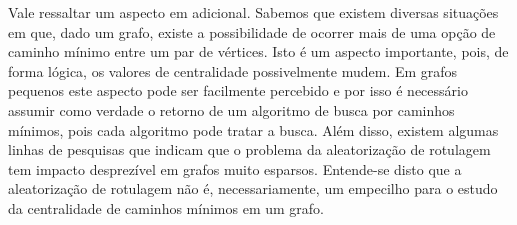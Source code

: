 Vale ressaltar um aspecto em adicional. Sabemos que existem diversas situações em que, dado um grafo, existe a possibilidade de ocorrer mais de uma opção de caminho mínimo entre um par de vértices. Isto é um aspecto importante, pois, de forma lógica, os valores de centralidade possivelmente mudem. Em grafos pequenos este aspecto pode ser facilmente percebido e por isso é necessário assumir como verdade o retorno de um algoritmo de busca por caminhos mínimos, pois cada algoritmo pode tratar a busca. Além disso, existem algumas linhas de pesquisas \cite{alane2021} que indicam que o problema da aleatorização de rotulagem tem impacto desprezível em grafos muito esparsos. Entende-se disto que a aleatorização de rotulagem não é, necessariamente, um empecilho para o estudo da centralidade de caminhos mínimos em um grafo.